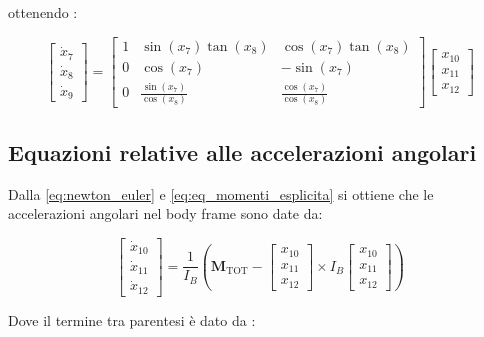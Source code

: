      ottenendo  : 
     
	 \begin{equation}
		\begin{bmatrix}
     	\dot{x}_7 \\[4pt]
     	\dot{x}_8 \\[4pt]
     	\dot{x}_9
     \end{bmatrix}
     =
     \begin{bmatrix}
     	1 & \sin(x_7)\tan(x_8) & \cos(x_7)\tan(x_8) \\
     	0 & \cos(x_7) & -\sin(x_7) \\
     	0 & \tfrac{\sin(x_7)}{\cos(x_8)} & \tfrac{\cos(x_7)}{\cos(x_8)}
     \end{bmatrix}
     \begin{bmatrix}
     	x_{10} \\ x_{11} \\ x_{12}
     \end{bmatrix}
	 \end{equation}
     
\clearpage
     
\subsection{Equazioni relative alle accelerazioni angolari}
\vspace{0.5cm}
Dalla \ref{eq:newton_euler} e \ref{eq:eq_momenti_esplicita} si ottiene che le accelerazioni angolari nel body frame 
sono date da:

\begin{equation}
\begin{bmatrix}
\dot{x}_{10} \\ \dot{x}_{11} \\ \dot{x}_{12}
\end{bmatrix}
=
\frac{1}{I_B}\left(
\bm{M}_{\text{TOT}} -
\begin{bmatrix}
x_{10} \\ x_{11} \\ x_{12}
\end{bmatrix}
\times
I_B
\begin{bmatrix}
x_{10} \\ x_{11} \\ x_{12}
\end{bmatrix}
\right)
\end{equation}

\vspace{0.5cm}
Dove il termine tra parentesi è dato da :

